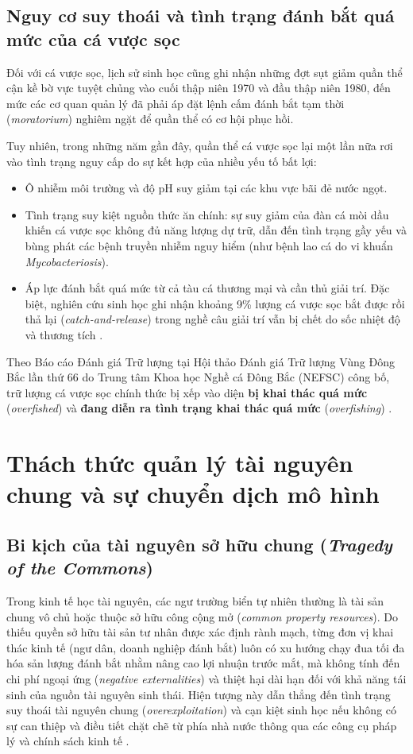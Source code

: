 \subsection{Nguy cơ suy thoái và tình trạng đánh bắt quá mức của cá vược sọc}

Đối với cá vược sọc, lịch sử sinh học cũng ghi nhận những đợt sụt giảm quần thể cận kề bờ vực tuyệt chủng vào cuối thập niên 1970 và đầu thập niên 1980, đến mức các cơ quan quản lý đã phải áp đặt lệnh cấm đánh bắt tạm thời (\textit{moratorium}) nghiêm ngặt để quần thể có cơ hội phục hồi.

Tuy nhiên, trong những năm gần đây, quần thể cá vược sọc lại một lần nữa rơi vào tình trạng nguy cấp do sự kết hợp của nhiều yếu tố bất lợi:
\begin{itemize}
    \item Ô nhiễm môi trường và độ pH suy giảm tại các khu vực bãi đẻ nước ngọt.
    \item Tình trạng suy kiệt nguồn thức ăn chính: sự suy giảm của đàn cá mòi dầu khiến cá vược sọc không đủ năng lượng dự trữ, dẫn đến tình trạng gầy yếu và bùng phát các bệnh truyền nhiễm nguy hiểm (như bệnh lao cá do vi khuẩn \textit{Mycobacteriosis}).
    \item Áp lực đánh bắt quá mức từ cả tàu cá thương mại và cần thủ giải trí. Đặc biệt, nghiên cứu sinh học ghi nhận khoảng 9\% lượng cá vược sọc bắt được rồi thả lại (\textit{catch-and-release}) trong nghề câu giải trí vẫn bị chết do sốc nhiệt độ và thương tích \cite{cbf2021rockfish}.
\end{itemize}
Theo Báo cáo Đánh giá Trữ lượng tại Hội thảo Đánh giá Trữ lượng Vùng Đông Bắc lần thứ 66 do Trung tâm Khoa học Nghề cá Đông Bắc (NEFSC) công bố, trữ lượng cá vược sọc chính thức bị xếp vào diện \textbf{bị khai thác quá mức} (\textit{overfished}) và \textbf{đang diễn ra tình trạng khai thác quá mức} (\textit{overfishing}) \cite{nefsc2019stripedbass}.

\section{Thách thức quản lý tài nguyên chung và sự chuyển dịch mô hình}
\label{sec:intro_management}

\subsection{Bi kịch của tài nguyên sở hữu chung (\textit{Tragedy of the Commons})}
Trong kinh tế học tài nguyên, các ngư trường biển tự nhiên thường là tài sản chung vô chủ hoặc thuộc sở hữu công cộng mở (\textit{common property resources}). Do thiếu quyền sở hữu tài sản tư nhân được xác định rành mạch, từng đơn vị khai thác kinh tế (ngư dân, doanh nghiệp đánh bắt) luôn có xu hướng chạy đua tối đa hóa sản lượng đánh bắt nhằm nâng cao lợi nhuận trước mắt, mà không tính đến chi phí ngoại ứng (\textit{negative externalities}) và thiệt hại dài hạn đối với khả năng tái sinh của nguồn tài nguyên sinh thái. Hiện tượng này dẫn thẳng đến tình trạng suy thoái tài nguyên chung (\textit{overexploitation}) và cạn kiệt sinh học nếu không có sự can thiệp và điều tiết chặt chẽ từ phía nhà nước thông qua các công cụ pháp lý và chính sách kinh tế \cite{finley2011all}.

